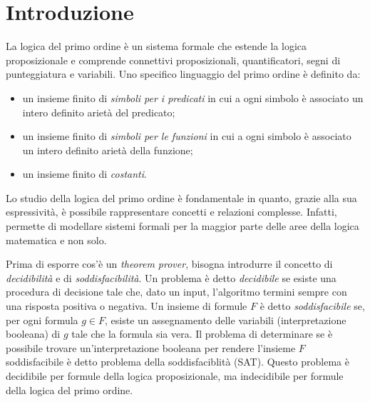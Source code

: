 \pagestyle{introduction}
\chapter*{Introduzione}
La logica del primo ordine è un sistema formale che estende la logica proposizionale e comprende connettivi proposizionali,
quantificatori, segni di punteggiatura e variabili. Uno specifico linguaggio del primo ordine è definito da:
\begin{itemize}
    \item un insieme finito di \emph{simboli per i predicati} in cui a ogni simbolo è associato un intero definito arietà del predicato;
    \item un insieme finito di \emph{simboli per le funzioni} in cui a ogni simbolo è associato un intero definito arietà della funzione;  
    \item un insieme finito di \emph{costanti}.
\end{itemize}
Lo studio della logica del primo ordine è fondamentale in quanto, grazie alla sua espressività,
è possibile rappresentare concetti e relazioni complesse. Infatti, 
permette di modellare sistemi formali per la maggior parte delle aree della logica matematica e non solo.

Prima di esporre cos'è un \emph{theorem prover}, bisogna introdurre il concetto di \emph{decidibilità} e di \emph{soddisfacibilità}. Un problema è detto \emph{decidibile} se esiste una 
procedura di decisione tale che, dato un input, l'algoritmo termini sempre con una risposta positiva o negativa. 
Un insieme di formule $F$ è detto \emph{soddisfacibile} se,
per ogni formula $g\in F$, esiste un assegnamento delle variabili (interpretazione booleana) di $g$ tale che la formula sia vera. 
Il problema di determinare se è possibile trovare un'interpretazione booleana per rendere l'insieme $F$ soddisfacibile è detto
problema della soddisfaciblità (SAT). Questo problema è decidibile per formule della logica proposizionale, ma indecidibile per formule 
della logica del primo ordine. 

